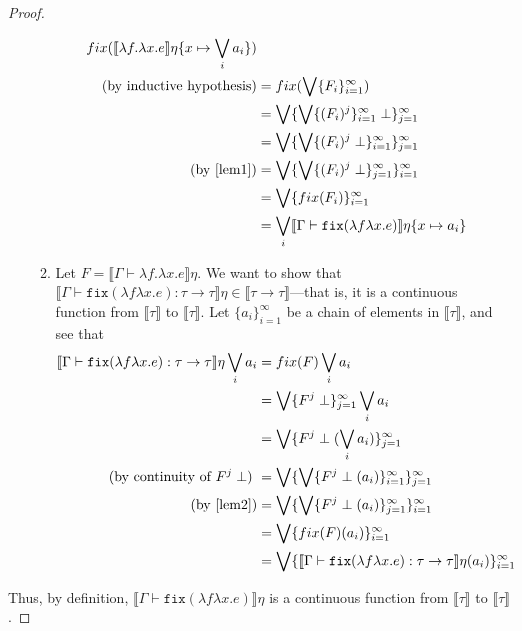 \begin{proof}
\begin{itemize}
\begin{enumerate}
\begin{align*}
 fix(\llbracket \lambda f. \lambda x.e \rrbracket\eta\{x\mapsto \bigvee_i a_i\})\\
 \text{(by inductive hypothesis)} &= fix(\bigvee\{F_i\}^{\infty}_{i=1}) \\
 &= \bigvee\{\bigvee\{(F_i)^j \}^{\infty}_{i=1}\perp\}^{\infty}_{j=1} \\
 &= \bigvee\{\bigvee\{(F_i)^j \perp\}^{\infty}_{i=1}\}^{\infty}_{j=1} \\ 
\text{(by \ref{lem1})} &= \bigvee\{\bigvee\{(F_i)^j \perp\}^{\infty}_{j=1}\}^{\infty}_{i=1} \\ 
&= \bigvee\{fix(F_i)\}^{\infty}_{i=1}\\
&= \bigvee_i \llbracket \Gamma \vdash \texttt{fix}(\lambda f \lambda x.e)\rrbracket\eta\{x\mapsto a_i\}
 \end{align*}
 \item Let $F = \llbracket \Gamma \vdash \lambda f. \lambda x.e\rrbracket\eta$. We want to show that 
 $\llbracket\Gamma\vdash\texttt{fix}(\lambda f \lambda x.e) : \tau 
 \rightarrow\tau\rrbracket\eta \in \llbracket \tau \rightarrow \tau \rrbracket$---that is, it is a continuous function from 
 $\llbracket \tau \rrbracket$ to $\llbracket \tau \rrbracket$. Let $\{a_i\}^{\infty}_{i=1}$ be a chain of elements in $\llbracket \tau \rrbracket$,
  and see that 
 \begin{align*}
 \llbracket\Gamma\vdash\texttt{fix}(\lambda f \lambda x.e) : \tau \rightarrow\tau\rrbracket\eta \bigvee_i a_i &= 
 fix(F)\bigvee_i a_i\\
 &=\bigvee\{F^j \perp\}^{\infty}_{j=1}\bigvee_i a_i\\
 &= \bigvee\{F^j \perp(\bigvee_i a_i)\}^{\infty}_{j=1}\\ 
 \text{(by continuity of $F^j \perp$) }&= \bigvee\{\bigvee\{F^j \perp(a_i)\}^{\infty}_{i=1}\}^{\infty}_{j=1}\\ 
 \text{(by \ref{lem2})} &=\bigvee\{\bigvee\{F^j \perp(a_i)\}^{\infty}_{j=1}\}^{\infty}_{i=1}\\
 &= \bigvee\{fix(F)(a_i)\}^{\infty}_{i=1}\\
 &= \bigvee\{\llbracket\Gamma\vdash\texttt{fix}(\lambda f \lambda x.e) : \tau \rightarrow\tau\rrbracket\eta(a_i)\}^{\infty}_{i=1}\\
 \end{align*}
 \end{enumerate}
 \end{itemize}
 Thus, by definition, $\llbracket \Gamma \vdash \texttt{fix}(\lambda f \lambda x.e) \rrbracket\eta$ is a continuous function
 from $\llbracket \tau \rrbracket$ to $\llbracket \tau \rrbracket$.
 \end{proof}
